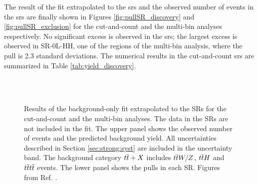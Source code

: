 The result of the fit extrapolated to the \glspl{sr} and the observed number of events in the \glspl{sr} are finally
shown in Figures \ref{fig:pullSR_discovery} and \ref{fig:pullSR_exclusion} 
for the cut-and-count and the multi-bin analyses respectively. 
No significant excess is observed in the \glspl{sr}; the largest excess is observed in SR-0L-HH, 
one of the regions of the multi-bin analysis, where the pull is 2.3 standard deviations. 
The numerical results in the cut-and-count \glspl{sr} are summarized in Table \ref{tab:yield_discovery}.

\begin{figure}[htbp]
	\centering
	\\
	\\
	\caption{Results of the background-only fit extrapolated to the SRs for 
	the cut-and-count and  the multi-bin analyses. The data in the  SRs are 
	not included in the fit.  The upper panel shows the observed number of events and the predicted background 
	yield. All uncertainties  described in Section \ref{sec:strong:syst} are included in the uncertainty band. The background 
	category $t\overline{t}+X$ includes $t\overline{t} W/Z$, $t\overline{t} H$ and $t\overline{t} t\overline{t}$ events. The lower panel shows the 
	pulls in each SR.  Figures from Ref. \cite{Aaboud:2017hrg}.} 
	\label{fig:pullSR}
\end{figure}

